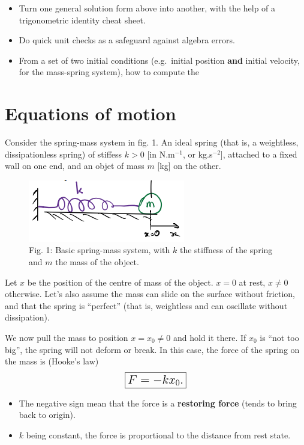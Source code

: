 \documentclass[11pt]{article}
\makeatletter
\def\maxwidth{\ifdim\Gin@nat@width>\linewidth\linewidth
    \else\Gin@nat@width\fi}
\let\Oldincludegraphics\includegraphics
\renewcommand{\includegraphics}[1]{\Oldincludegraphics[width=.8\maxwidth]{#1}}
\providecommand{\tightlist}{%
      \setlength{\itemsep}{0pt}\setlength{\parskip}{0pt}}
\makeatother
\begin{document}
\begin{itemize}
\tightlist
\item
  Turn one general solution form above into another, with the help of a
  trigonometric identity cheat sheet.
\item
  Do quick unit checks as a safeguard against algebra errors.
\item
  From a set of two initial conditions (e.g.~initial position
  \textbf{and} initial velocity, for the mass-spring system), how to
  compute the
\end{itemize}

    \hypertarget{equations-of-motion}{%
\section{Equations of motion}\label{equations-of-motion}}

Consider the spring-mass system in fig. 1. An ideal spring (that is, a
weightless, dissipationless spring) of stiffess \(k > 0\) {[}in
N.m\(^{-1}\), or kg.s\(^{-2}\){]}, attached to a fixed wall on one end,
and an objet of mass \(m\) {[}kg{]} on the other.

\begin{figure}
\centering
\includegraphics{SpringMass.png}
\caption{Fig. 1: Basic spring-mass system, with \(k\) the stiffness of
the spring and \(m\) the mass of the object.}
\end{figure}

Let \(x\) be the position of the centre of mass of the object. \(x=0\)
at rest, \(x\neq 0\) otherwise. Let's also assume the mass can slide on
the surface without friction, and that the spring is ``perfect'' (that
is, weightless and can oscillate without dissipation).

    We now pull the mass to position \(x = x_0 \neq 0\) and hold it there.
If \(x_0\) is ``not too big'', the spring will not deform or break. In
this case, the force of the spring on the mass is (Hooke's law)
\[ \Large \boxed{F = -kx_0.} \]

\begin{itemize}
\item
  The negative sign mean that the force is a \textbf{restoring force}
  (tends to bring back to origin).
\item
  \(k\) being constant, the force is proportional to the distance from
  rest state.
\end{itemize}
\end{document}
